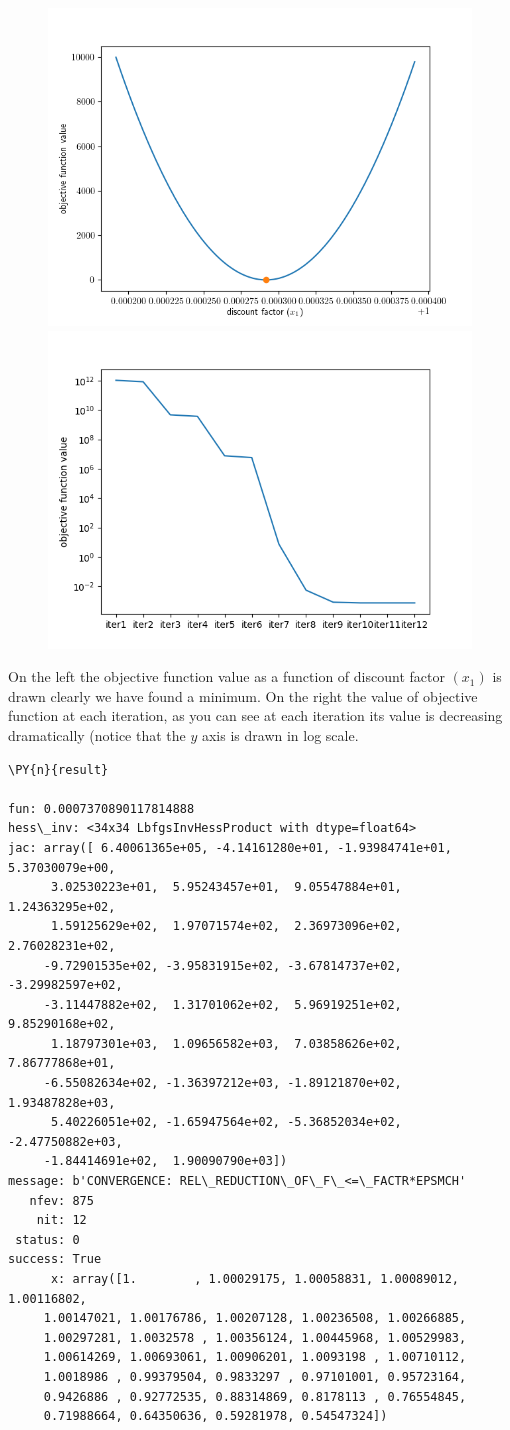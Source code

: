 \begin{figure}[h]
  \centering
  \includegraphics[width=0.45\linewidth]{obj_func.png}
  \includegraphics[width=0.45\linewidth]{obj_func_iter.png}
\end{figure}
On the left the objective function value as a function of discount factor $(x_1)$ is drawn clearly we have found a minimum. On the right the value of objective function at each iteration, as you can see at each iteration its value is decreasing dramatically (notice that the $y$ axis is drawn in log scale.

\begin{tcolorbox}[breakable, size=fbox, boxrule=1pt, pad at break*=1mm,colback=cellbackground, colframe=cellborder]
\begin{Verbatim}[commandchars=\\\{\}]
\PY{n}{result}

fun: 0.0007370890117814888
hess\_inv: <34x34 LbfgsInvHessProduct with dtype=float64>
jac: array([ 6.40061365e+05, -4.14161280e+01, -1.93984741e+01,  5.37030079e+00,
      3.02530223e+01,  5.95243457e+01,  9.05547884e+01,  1.24363295e+02,
      1.59125629e+02,  1.97071574e+02,  2.36973096e+02,  2.76028231e+02,
     -9.72901535e+02, -3.95831915e+02, -3.67814737e+02, -3.29982597e+02,
     -3.11447882e+02,  1.31701062e+02,  5.96919251e+02,  9.85290168e+02,
      1.18797301e+03,  1.09656582e+03,  7.03858626e+02,  7.86777868e+01,
     -6.55082634e+02, -1.36397212e+03, -1.89121870e+02,  1.93487828e+03,
      5.40226051e+02, -1.65947564e+02, -5.36852034e+02, -2.47750882e+03,
     -1.84414691e+02,  1.90090790e+03])
message: b'CONVERGENCE: REL\_REDUCTION\_OF\_F\_<=\_FACTR*EPSMCH'
   nfev: 875
    nit: 12
 status: 0
success: True
      x: array([1.        , 1.00029175, 1.00058831, 1.00089012, 1.00116802,
     1.00147021, 1.00176786, 1.00207128, 1.00236508, 1.00266885,
     1.00297281, 1.0032578 , 1.00356124, 1.00445968, 1.00529983,
     1.00614269, 1.00693061, 1.00906201, 1.0093198 , 1.00710112,
     1.0018986 , 0.99379504, 0.9833297 , 0.97101001, 0.95723164,
     0.9426886 , 0.92772535, 0.88314869, 0.8178113 , 0.76554845,
     0.71988664, 0.64350636, 0.59281978, 0.54547324])
\end{Verbatim}
\end{tcolorbox}


